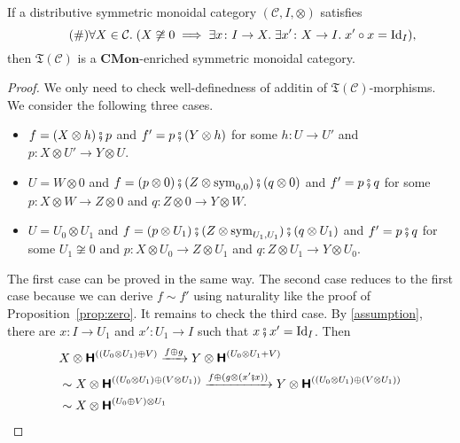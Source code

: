 \begin{theorem}\label{thm:set-like}
  If a distributive symmetric monoidal category
  $(\mathcal{C},I,\otimes)$ satisfies
  \begin{equation}\label{assumption}\tag{\#}
    \forall X \in \mathcal{C}.\; (X \not\cong 0 \implies
    \exists x \colon I \to X.\;
    \exists x' \colon X \to I.\; x' \circ x  = \mbox{Id}_{I}),
  \end{equation}
  then $\mathfrak{T}(\mathcal{C})$ is a $\mathbf{CMon}$-enriched
  symmetric monoidal category.
\end{theorem}
\begin{proof}
  We only need to check well-definedness of additin of
  $\mathfrak{T}(\mathcal{C})$-morphisms. We consider
  the following three cases.
  \begin{itemize}
  \item $f = (X \otimes h) \fatsemi p$ and
    $f' = p \fatsemi (Y \otimes h)$ for some $h \colon U \to U'$ and
    $p \colon X \otimes U' \to Y \otimes U$.
  \item $U = W \otimes 0$ and
    $f = (p \otimes 0) \fatsemi (Z \otimes
    \mathrm{sym}_{0,0}) \fatsemi (q \otimes 0)$ and
    $f' = p \fatsemi q$ for some
    $p \colon X \otimes W \to Z \otimes 0$ and
    $q \colon Z \otimes 0 \to Y \otimes W$.
  \item $U = U_{0} \otimes U_{1}$ and
    $f = (p \otimes U_{1}) \fatsemi (Z \otimes
    \mathrm{sym}_{U_{1},U_{1}}) \fatsemi (q \otimes U_{1})$ and
    $f' = p \fatsemi q$ for some $U_{1} \not\cong 0$ and
    $p \colon X \otimes U_{0} \to Z \otimes U_{1}$ and
    $q \colon Z \otimes U_{1} \to Y \otimes U_{0}$.
  \end{itemize}
  The first case can be proved in the same way. The second case
  reduces to the first case because we can derive $f \sim f'$ using
  naturality like the proof of Proposition~\ref{prop:zero}. It remains
  to check the third case. By \eqref{assumption}, there are
  $x \colon I \to U_{1}$ and $x' \colon U_{1} \to I$ such that
  $x \fatsemi x' = \mbox{Id}_{I}$. Then
  \begin{align*}
    &X \otimes \hide{((U_{0} \otimes U_{1}) \oplus V)}
      \xrightarrow{f \oplus g} Y \otimes \hide{(U_{0} \otimes U_{1} + V)} \\
    &\sim
      X \otimes \hide{((U_{0} \otimes U_{1}) \oplus (V \otimes U_{1}))}
      \xrightarrow{f \oplus (g \otimes (x' \fatsemi x))}
      Y \otimes \hide{((U_{0} \otimes U_{1}) \oplus (V \otimes U_{1}))} \\
    &\sim
      X \otimes \hide{(U_{0} \oplus V) \otimes U_{1}}

\end{align*}
\end{proof}
